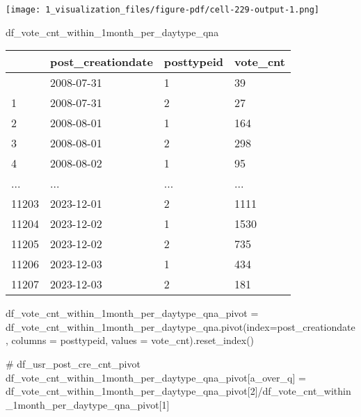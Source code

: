 \documentclass[
  letterpaper,
  DIV=11,
  numbers=noendperiod]{scrartcl}
\newenvironment{Shaded}{\begin{snugshade}}{\end{snugshade}}
\newcommand{\CommentTok}[1]{\textcolor[rgb]{0.37,0.37,0.37}{#1}}
\newcommand{\NormalTok}[1]{\textcolor[rgb]{0.00,0.23,0.31}{#1}}
\newcommand{\OperatorTok}[1]{\textcolor[rgb]{0.37,0.37,0.37}{#1}}
\newcommand{\StringTok}[1]{\textcolor[rgb]{0.13,0.47,0.30}{#1}}
\begin{document}
\texttt{[image: 1\_visualization\_files/figure-pdf/cell-229-output-1.png]}

\begin{Shaded}
\begin{Highlighting}[]
\NormalTok{df\_vote\_cnt\_within\_1month\_per\_daytype\_qna}
\end{Highlighting}
\end{Shaded}

\begin{longtable}[]{@{}llll@{}}
\toprule\noalign{}
& post\_creationdate & posttypeid & vote\_cnt \\
\midrule\noalign{}
\endhead
\bottomrule\noalign{}
\endlastfoot
0 & 2008-07-31 & 1 & 39 \\
1 & 2008-07-31 & 2 & 27 \\
2 & 2008-08-01 & 1 & 164 \\
3 & 2008-08-01 & 2 & 298 \\
4 & 2008-08-02 & 1 & 95 \\
... & ... & ... & ... \\
11203 & 2023-12-01 & 2 & 1111 \\
11204 & 2023-12-02 & 1 & 1530 \\
11205 & 2023-12-02 & 2 & 735 \\
11206 & 2023-12-03 & 1 & 434 \\
11207 & 2023-12-03 & 2 & 181 \\
\end{longtable}

\begin{Shaded}
\begin{Highlighting}[]
\NormalTok{df\_vote\_cnt\_within\_1month\_per\_daytype\_qna\_pivot }\OperatorTok{=}\NormalTok{ df\_vote\_cnt\_within\_1month\_per\_daytype\_qna.pivot(index}\OperatorTok{=}\StringTok{\textquotesingle{}post\_creationdate\textquotesingle{}}\NormalTok{, columns }\OperatorTok{=} \StringTok{\textquotesingle{}posttypeid\textquotesingle{}}\NormalTok{, values }\OperatorTok{=} \StringTok{\textquotesingle{}vote\_cnt\textquotesingle{}}\NormalTok{).reset\_index()}
\end{Highlighting}
\end{Shaded}

\begin{Shaded}
\begin{Highlighting}[]
\CommentTok{\# df\_usr\_post\_cre\_cnt\_pivot}
\NormalTok{df\_vote\_cnt\_within\_1month\_per\_daytype\_qna\_pivot[}\StringTok{\textquotesingle{}a\_over\_q\textquotesingle{}}\NormalTok{] }\OperatorTok{=}\NormalTok{ df\_vote\_cnt\_within\_1month\_per\_daytype\_qna\_pivot[}\StringTok{\textquotesingle{}2\textquotesingle{}}\NormalTok{]}\OperatorTok{/}\NormalTok{df\_vote\_cnt\_within\_1month\_per\_daytype\_qna\_pivot[}\StringTok{\textquotesingle{}1\textquotesingle{}}\NormalTok{]}
\end{Highlighting}
\end{Shaded}
\end{document}
